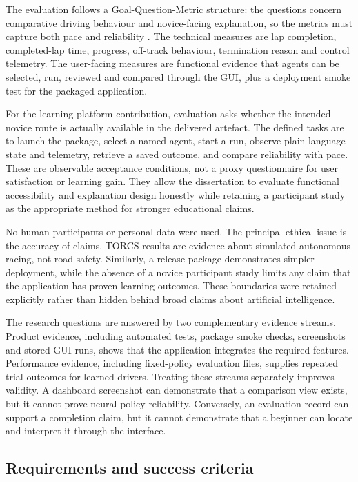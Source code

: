 The evaluation follows a Goal-Question-Metric structure: the questions concern comparative driving behaviour and novice-facing explanation, so the metrics must capture both pace and reliability \parencite{basili1994}. The technical measures are lap completion, completed-lap time, progress, off-track behaviour, termination reason and control telemetry. The user-facing measures are functional evidence that agents can be selected, run, reviewed and compared through the GUI, plus a deployment smoke test for the packaged application.

For the learning-platform contribution, evaluation asks whether the intended novice route is actually available in the delivered artefact. The defined tasks are to launch the package, select a named agent, start a run, observe plain-language state and telemetry, retrieve a saved outcome, and compare reliability with pace. These are observable acceptance conditions, not a proxy questionnaire for user satisfaction or learning gain. They allow the dissertation to evaluate functional accessibility and explanation design honestly while retaining a participant study as the appropriate method for stronger educational claims.

No human participants or personal data were used. The principal ethical issue is the accuracy of claims. TORCS results are evidence about simulated autonomous racing, not road safety. Similarly, a release package demonstrates simpler deployment, while the absence of a novice participant study limits any claim that the application has proven learning outcomes. These boundaries were retained explicitly rather than hidden behind broad claims about artificial intelligence.

The research questions are answered by two complementary evidence streams. Product evidence, including automated tests, package smoke checks, screenshots and stored GUI runs, shows that the application integrates the required features. Performance evidence, including fixed-policy evaluation files, supplies repeated trial outcomes for learned drivers. Treating these streams separately improves validity. A dashboard screenshot can demonstrate that a comparison view exists, but it cannot prove neural-policy reliability. Conversely, an evaluation record can support a completion claim, but it cannot demonstrate that a beginner can locate and interpret it through the interface.

\subsection{Requirements and success criteria}

